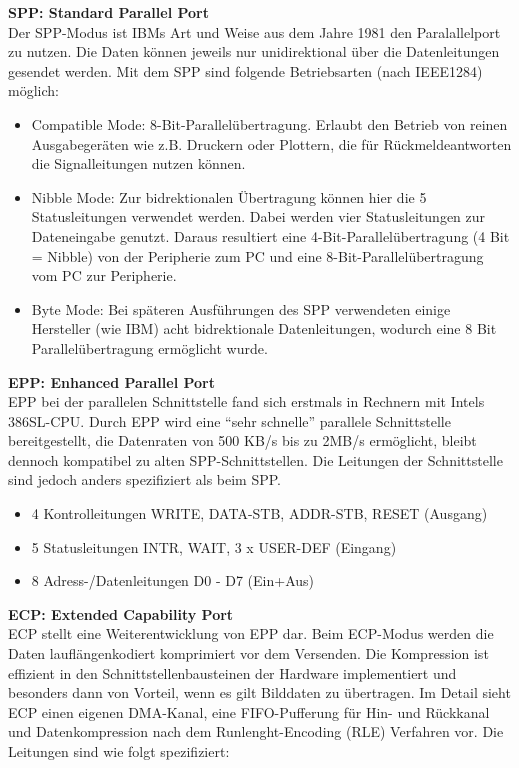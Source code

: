 \documentclass[a4paper,11pt]{article}
\begin{document}
\textbf{SPP: Standard Parallel Port}
\\
Der SPP-Modus ist IBMs Art und Weise aus dem Jahre 1981 den Paralallelport zu nutzen. Die Daten können jeweils nur unidirektional über die Datenleitungen gesendet werden. Mit dem SPP sind folgende Betriebsarten (nach IEEE1284) möglich:
\begin{itemize}
\item Compatible Mode:
      8-Bit-Parallelübertragung. Erlaubt den Betrieb von reinen Ausgabegeräten wie z.B. Druckern oder Plottern, die für Rückmeldeantworten die Signalleitungen nutzen können. 
\item Nibble Mode:
      Zur bidrektionalen Übertragung können hier die 5 Statusleitungen verwendet werden. Dabei werden vier Statusleitungen zur Dateneingabe genutzt. Daraus resultiert eine 4-Bit-Parallelübertragung (4 Bit = Nibble) von der Peripherie zum PC und eine 8-Bit-Parallelübertragung vom PC zur Peripherie.
\item Byte Mode:
      Bei späteren Ausführungen des SPP verwendeten einige Hersteller (wie IBM) acht bidrektionale Datenleitungen, wodurch eine 8 Bit Parallelübertragung ermöglicht wurde.\end{itemize}

\textbf{EPP: Enhanced Parallel Port}
\\
EPP bei der parallelen Schnittstelle fand sich erstmals in Rechnern mit Intels 386SL-CPU. Durch EPP wird eine ``sehr schnelle'' parallele Schnittstelle bereitgestellt, die Datenraten von 500 KB/s bis zu 2MB/s ermöglicht, bleibt dennoch kompatibel zu alten SPP-Schnittstellen.
Die Leitungen der Schnittstelle sind jedoch anders spezifiziert als beim SPP.

\begin{itemize}
\item 4 Kontrolleitungen WRITE, DATA-STB, ADDR-STB, RESET (Ausgang)
\item 5 Statusleitungen INTR, WAIT, 3 x USER-DEF (Eingang)
\item 8 Adress-/Datenleitungen D0 - D7 (Ein+Aus) \end{itemize}

\textbf{ECP: Extended Capability Port}
\\
ECP stellt eine Weiterentwicklung von EPP dar. Beim ECP-Modus werden die Daten lauflängenkodiert komprimiert vor dem Versenden. Die Kompression ist effizient in den Schnittstellenbausteinen der Hardware implementiert und besonders dann von Vorteil, wenn es gilt Bilddaten zu übertragen. Im Detail sieht ECP einen eigenen DMA-Kanal, eine FIFO-Pufferung für Hin- und Rückkanal und Datenkompression nach dem Runlenght-Encoding (RLE) Verfahren vor. Die Leitungen sind wie folgt spezifiziert:
\end{document}
